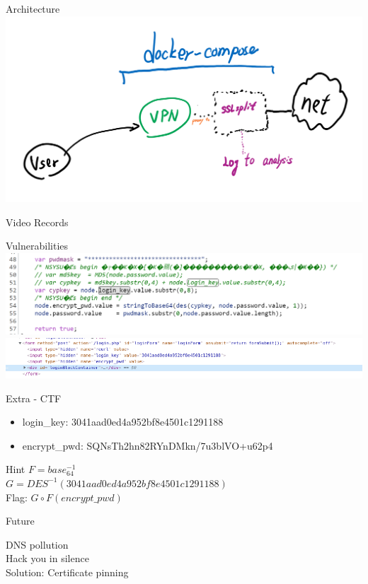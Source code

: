 \documentclass{beamer}
\begin{document}
\begin{frame}{Architecture}
    \includegraphics[width=\textwidth]{images/image_2022-01-14_01-52-22.png}
\end{frame}

\begin{frame}
    \centering
    \Huge
    Video Records
\end{frame}

\begin{frame}{Vulnerabilities}
    \includegraphics[width=\textwidth]{images/image_2022-01-14_01-02-16.png}
    \includegraphics[width=\textwidth]{images/Screenshot_2022-01-14_01-11-36.png}
\end{frame}

\begin{frame}{Extra - CTF}
    \begin{itemize}
        \item login\_key: 3041aad0ed4a952bf8e4501c1291188
        \item encrypt\_pwd: SQNsTh2hn82RYnDMkn/7u3blVO+u62p4
    \end{itemize}
    \begin{beamerboxesrounded}{Hint}
        $F=base_{64}^{-1}$\\
        $G=DES^{-1}(3041aad0ed4a952bf8e4501c1291188)$\\
        Flag: $G \circ F(encrypt\_pwd)$
    \end{beamerboxesrounded}
\end{frame}

\begin{frame}{Future}

    DNS pollution\\
    {\color{red} \LARGE Hack you in silence}\\
    Solution: Certificate pinning
\end{frame}
\end{document}
